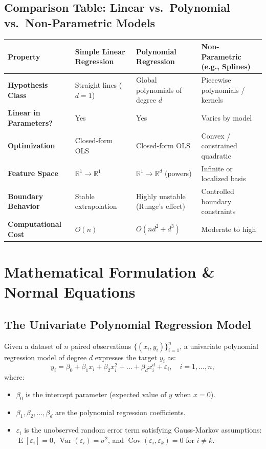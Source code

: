 \documentclass[11pt,a4paper]{article}
\numberwithin{equation}{section}
\newcommand{\RR}{\mathbb{R}}
\newcommand{\E}{\operatorname{E}}
\newcommand{\Var}{\operatorname{Var}}
\newcommand{\Cov}{\operatorname{Cov}}
\begin{document}
\subsection{Comparison Table: Linear vs.\ Polynomial vs.\ Non-Parametric Models}
\begin{center}
\small
\begin{tabularx}{\textwidth}{>{\bfseries}l >{\raggedright\arraybackslash}X >{\raggedright\arraybackslash}X >{\raggedright\arraybackslash}X}
\toprule
Property & Simple Linear Regression & Polynomial Regression & Non-Parametric (e.g., Splines) \\
\midrule
Hypothesis Class & Straight lines ($d=1$) & Global polynomials of degree $d$ & Piecewise polynomials / kernels \\
Linear in Parameters? & Yes & Yes & Varies by model \\
Optimization & Closed-form OLS & Closed-form OLS & Convex / constrained quadratic \\
Feature Space & $\RR^1 \to \RR^1$ & $\RR^1 \to \RR^{d}$ (powers) & Infinite or localized basis \\
Boundary Behavior & Stable extrapolation & Highly unstable (Runge's effect) & Controlled boundary constraints \\
Computational Cost & $O(n)$ & $O(n d^2 + d^3)$ & Moderate to high \\
\bottomrule
\end{tabularx}
\end{center}


\section{Mathematical Formulation \& Normal Equations}

\subsection{The Univariate Polynomial Regression Model}
Given a dataset of $n$ paired observations $\{(x_i, y_i)\}_{i=1}^n$, a univariate polynomial regression model of degree $d$ expresses the target $y_i$ as:
\begin{equation}
  y_i = \beta_0 + \beta_1 x_i + \beta_2 x_i^2 + \dots + \beta_d x_i^d + \varepsilon_i, \quad i = 1, \dots, n,
  \label{eq:scalar_model}
\end{equation}
where:
\begin{itemize}
  \item $\beta_0$ is the intercept parameter (expected value of $y$ when $x = 0$).
  \item $\beta_1, \beta_2, \dots, \beta_d$ are the polynomial regression coefficients.
  \item $\varepsilon_i$ is the unobserved random error term satisfying Gauss-Markov assumptions: $\E[\varepsilon_i] = 0$, $\Var(\varepsilon_i) = \sigma^2$, and $\Cov(\varepsilon_i, \varepsilon_k) = 0$ for $i \neq k$.
\end{itemize}
\end{document}
